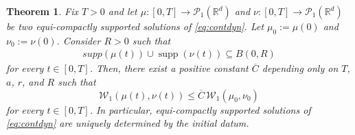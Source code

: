 \documentclass[A4paper,11pt]{article}
\newtheorem{theorem}{Theorem}[section]
\theoremstyle{definition}
\newcommand{\R}{\mathbb{R}}
\newcommand{\W}{\mathcal{W}}
\DeclareMathOperator{\supp}{supp}
\begin{document}
\begin{theorem}\label{uniq}
Fix $T>0$  and let $\mu:[0,T]\rightarrow\mathcal{P}_1(\R^d)$ and $\nu:[0,T]\rightarrow\mathcal{P}_1(\R^d)$ be two equi-compactly supported solutions  of \eqref{eq:contdyn}. Let $\mu_0:=\mu(0)$ and $\nu_0:=\nu(0)$. Consider $R>0$ such that
\begin{align}\label{supptot}
supp(\mu(t))\cup\supp(\nu(t)) \subseteq B(0, R)
\end{align}
for every $t \in[0, T]$. Then, there exist a positive constant $\overline{C}$ depending only on $T$, $a$, $r$, and $R$ such that
\begin{equation}\label{stab}
\W_1(\mu(t), \nu(t)) \le \overline{C} \, \W_1(\mu_0, \nu_0)
\end{equation}
for every $t \in [0, T]$. In particular, equi-compactly supported solutions of \eqref{eq:contdyn} are uniquely determined by the initial datum.
\end{theorem}
\end{document}
